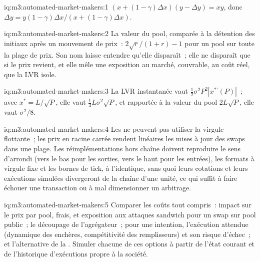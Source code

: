 \begin{solution}{iq:m3:automated-market-makers:1}
$(x + (1 - \gamma)\Delta x)(y - \Delta y) = xy$, donc $\Delta y = y(1 - \gamma)\Delta x/(x + (1 - \gamma)\Delta x)$.
\end{solution}

\begin{solution}{iq:m3:automated-market-makers:2}
La valeur du pool, comparée à la détention des  initiaux après un mouvement de prix~: $2\sqrt r/(1 + r) - 1$ pour un pool sur toute la plage de prix. Son nom laisse entendre
qu'elle disparaît~; elle ne disparaît que si le prix revient, et elle mêle une exposition au marché, couvrable, au coût réel, que la LVR isole.
\end{solution}

\begin{solution}{iq:m3:automated-market-makers:3}
La LVR instantanée vaut $\tfrac12\sigma^2P^2|x^{*\prime}(P)|$~; avec $x^* = L/\sqrt P$, elle vaut $\tfrac14L\sigma^2\sqrt P$, et rapportée à la valeur du pool
$2L\sqrt P$, elle vaut $\sigma^2/8$.
\end{solution}

\begin{solution}{iq:m3:automated-market-makers:4}
Les  ne peuvent pas utiliser la virgule flottante~; les prix en racine carrée rendent linéaires les mises à jour des swaps dans une plage. Les réimplémentations hors chaîne doivent reproduire
le sens d'arrondi (vers le bas pour les sorties, vers le haut pour les entrées), les formats à virgule fixe et les bornes de tick, à l'identique, sans quoi leurs cotations et leurs exécutions simulées
divergeront de la chaîne d'une unité, ce qui suffit à faire échouer une transaction ou à mal dimensionner un arbitrage.
\end{solution}

\begin{solution}{iq:m3:automated-market-makers:5}
Comparer les coûts tout compris~: impact sur le prix par pool, frais,  et exposition aux attaques sandwich pour un swap sur pool public~; le découpage de l'agrégateur~; pour une
intention, l'exécution attendue (dynamique des enchères, compétitivité des remplisseurs) et son risque d'échec~; et l'alternative de la . Simuler chacune
de ces options à partir de l'état courant et de l'historique d'exécutions propre à la société.
\end{solution}

